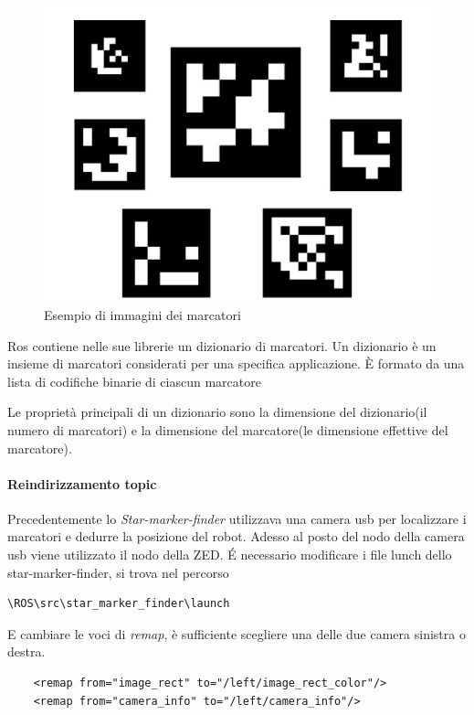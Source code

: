 \documentclass[a4paper]{article}
\begin{document}
\begin{figure}[htbp]
\centering
\includegraphics[scale=0.5]{marker_img.PNG} 
\caption{Esempio di immagini dei marcatori}
\end{figure}



Ros contiene nelle sue librerie un dizionario di marcatori. Un dizionario è un insieme di marcatori considerati per una specifica applicazione. È formato da  una lista di codifiche binarie di ciascun marcatore

Le proprietà principali di un dizionario sono la dimensione del dizionario(il numero di marcatori) e la dimensione del marcatore(le dimensione effettive del marcatore).
\paragraph{Reindirizzamento topic}
Precedentemente lo \textit{Star-marker-finder} utilizzava una camera usb per localizzare i marcatori e dedurre la posizione del robot. Adesso al posto del nodo della camera usb viene utilizzato il nodo della ZED. \'E
necessario modificare i file lunch dello star-marker-finder, si trova nel percorso
\begin{verbatim}
\ROS\src\star_marker_finder\launch
\end{verbatim}
E cambiare le voci di \textit{remap}, è sufficiente scegliere una delle due camera sinistra o destra.
\begin{verbatim}
    <remap from="image_rect" to="/left/image_rect_color"/>
    <remap from="camera_info" to="/left/camera_info"/>
\end{verbatim}
\end{document}
